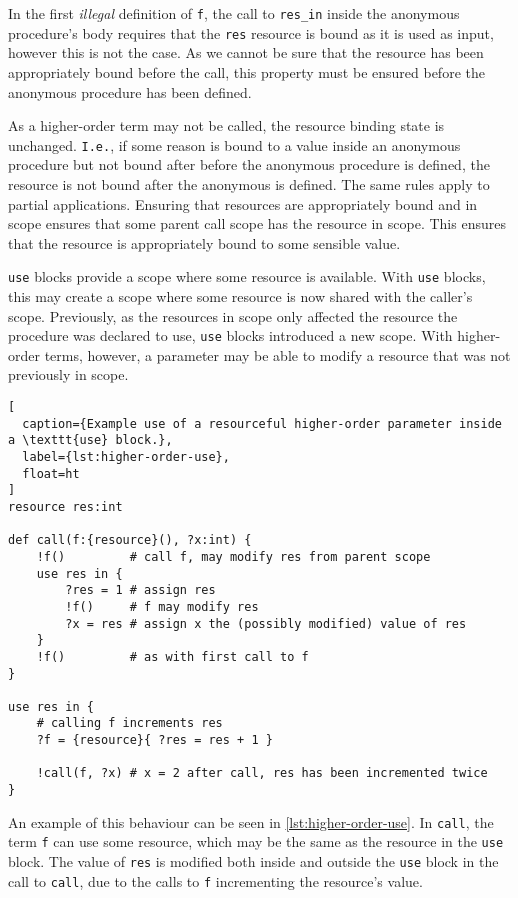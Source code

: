In the first \textit{illegal} definition of \texttt{f}, the call to \texttt{res\_in} inside the anonymous procedure's body requires that the \texttt{res} resource is bound as it is used as input, however this is not the case. As we cannot be sure that the resource has been appropriately bound before the call, this property must be ensured before the anonymous procedure has been defined. 

As a higher-order term may not be called, the resource binding state is unchanged. \texttt{I.e.}, if some reason is bound to a value inside an anonymous procedure but not bound after before the anonymous procedure is defined, the resource is not bound after the anonymous is defined. The same rules apply to partial applications. Ensuring that resources are appropriately bound and in scope ensures that some parent call scope has the resource in scope. This ensures that the resource is appropriately bound to some sensible value.

\texttt{use} blocks provide a scope where some resource is available. With \texttt{use} blocks, this may create a scope where some resource is now shared with the caller's scope. Previously, as the resources in scope only affected the resource the procedure was declared to use, \texttt{use} blocks introduced a new scope. With higher-order terms, however, a parameter may be able to modify a resource that was not previously in scope.

\begin{lstlisting}[
  caption={Example use of a resourceful higher-order parameter inside a \texttt{use} block.},
  label={lst:higher-order-use},
  float=ht
]
resource res:int

def call(f:{resource}(), ?x:int) {
    !f()         # call f, may modify res from parent scope
    use res in {
        ?res = 1 # assign res
        !f()     # f may modify res 
        ?x = res # assign x the (possibly modified) value of res
    } 
    !f()         # as with first call to f
}

use res in {
    # calling f increments res
    ?f = {resource}{ ?res = res + 1 }

    !call(f, ?x) # x = 2 after call, res has been incremented twice
}
\end{lstlisting}

An example of this behaviour can be seen in \cref{lst:higher-order-use}. In \texttt{call}, the term \texttt{f} can use some resource, which may be the same as the resource in the \texttt{use} block. The value of \texttt{res} is modified both inside and outside the \texttt{use} block in the call to \texttt{call}, due to the calls to \texttt{f} incrementing the resource's value. 

